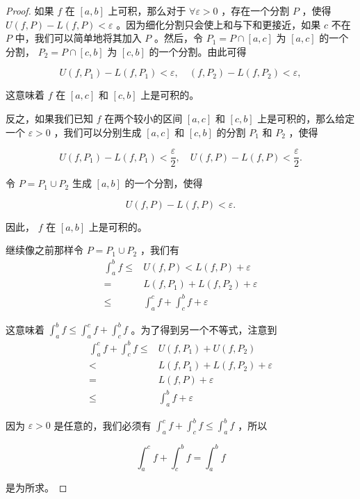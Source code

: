 \begin{proof}
  如果 \(f\) 在 \(\left\lbrack  {a,b}\right\rbrack\) 上可积，那么对于 \( \forall \varepsilon  > 0\) ，存在一个分割 \(P\) ，使得 \(U\left( {f,P}\right)  - L\left( {f,P}\right)  < \varepsilon\) 。因为细化分割只会使上和与下和更接近，如果 \(c\) 不在 \(P\) 中，我们可以简单地将其加入 \(P\) 。然后，令 \({P}_{1} = P \cap  \left\lbrack  {a,c}\right\rbrack\) 为 \(\left\lbrack  {a,c}\right\rbrack\) 的一个分割， \({P}_{2} = P \cap  \left\lbrack  {c,b}\right\rbrack\) 为 \(\left\lbrack  {c,b}\right\rbrack\) 的一个分割。由此可得

\[
U\left( {f,{P}_{1}}\right)  - L\left( {f,{P}_{1}}\right)  < \varepsilon, \quad \left( {f,{P}_{2}}\right)  - L\left( {f,{P}_{2}}\right)  < \varepsilon ,
\]

这意味着 \(f\) 在 \(\left\lbrack  {a,c}\right\rbrack\) 和 \(\left\lbrack  {c,b}\right\rbrack\) 上是可积的。

反之，如果我们已知 \(f\) 在两个较小的区间 \(\left\lbrack  {a,c}\right\rbrack\) 和 \(\left\lbrack  {c,b}\right\rbrack\) 上是可积的，那么给定一个 \(\varepsilon  > 0\) ，我们可以分别生成 \(\left\lbrack  {a,c}\right\rbrack\) 和 \(\left\lbrack  {c,b}\right\rbrack\) 的分割 \({P}_{1}\) 和 \({P}_{2}\) ，使得

\[
U\left( {f,{P}_{1}}\right)  - L\left( {f,{P}_{1}}\right)  < \frac{\varepsilon }{2}, \quad U\left( {f,P}\right)  - L\left( {f,P}\right)  < \frac{\varepsilon }{2}.
\]

令 \(P = {P}_{1} \cup  {P}_{2}\) 生成 \(\left\lbrack  {a,b}\right\rbrack\) 的一个分割，使得

\[
U\left( {f,P}\right)  - L\left( {f,P}\right)  < \varepsilon .
\]

因此， \(f\) 在 \(\left\lbrack  {a,b}\right\rbrack\) 上是可积的。

继续像之前那样令 \(P = {P}_{1} \cup  {P}_{2}\) ，我们有
\begin{align*}
{\int }_{a}^{b}f \leq  & U\left( {f,P}\right)  < L\left( {f,P}\right)  + \varepsilon\\
= &  L\left( {f,{P}_{1}}\right)  + L\left( {f,{P}_{2}}\right)  + \varepsilon\\
\leq  & {\int }_{a}^{c}f + {\int }_{c}^{b}f + \varepsilon
\end{align*}

这意味着 \({\int }_{a}^{b}f \leq  {\int }_{a}^{c}f + {\int }_{c}^{b}f\) 。为了得到另一个不等式，注意到
\begin{align*}
{\int }_{a}^{c}f + {\int }_{c}^{b}f \leq &   U\left( {f,{P}_{1}}\right)  + U\left( {f,{P}_{2}}\right)\\
< & L\left( {f,{P}_{1}}\right)  + L\left( {f,{P}_{2}}\right)  + \varepsilon\\
= & L\left( {f,P}\right)  + \varepsilon\\
\leq & {\int }_{a}^{b}f + \varepsilon
\end{align*}


因为 \(\varepsilon  > 0\) 是任意的，我们必须有 \({\int }_{a}^{c}f + {\int }_{c}^{b}f \leq  {\int }_{a}^{b}f\) ，所以

\[
{\int }_{a}^{c}f + {\int }_{c}^{b}f = {\int }_{a}^{b}f
\]

是为所求。
\end{proof}

